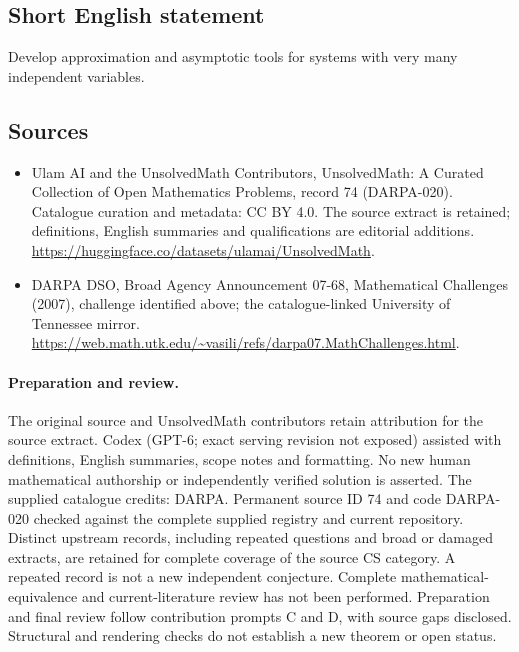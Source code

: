 \documentclass[11pt]{article}
\begin{document}
\subsection{Short English statement}
Develop approximation and asymptotic tools for systems with very many independent variables.
\subsection{Sources}
\begin{itemize}
\item[\hypertarget{source:74:1}{S1}] Ulam AI and the UnsolvedMath Contributors, UnsolvedMath: A Curated Collection of Open Mathematics Problems, record 74 (DARPA-020). Catalogue curation and metadata: CC BY 4.0. The source extract is retained; definitions, English summaries and qualifications are editorial additions.
\url{https://huggingface.co/datasets/ulamai/UnsolvedMath}.
\item[\hypertarget{source:74:2}{S2}] DARPA DSO, Broad Agency Announcement 07-68, Mathematical Challenges (2007), challenge identified above; the catalogue-linked University of Tennessee mirror.
\url{https://web.math.utk.edu/~vasili/refs/darpa07.MathChallenges.html}.
\end{itemize}
\paragraph{Preparation and review.}
The original source and UnsolvedMath contributors retain attribution for the source extract. Codex (GPT-6; exact serving revision not exposed) assisted with definitions, English summaries, scope notes and formatting. No new human mathematical authorship or independently verified solution is asserted. The supplied catalogue credits: DARPA. Permanent source ID 74 and code DARPA-020 checked against the complete supplied registry and current repository. Distinct upstream records, including repeated questions and broad or damaged extracts, are retained for complete coverage of the source CS category. A repeated record is not a new independent conjecture. Complete mathematical-equivalence and current-literature review has not been performed. Preparation and final review follow contribution prompts C and D, with source gaps disclosed. Structural and rendering checks do not establish a new theorem or open status.
\label{end:74}
\end{document}
